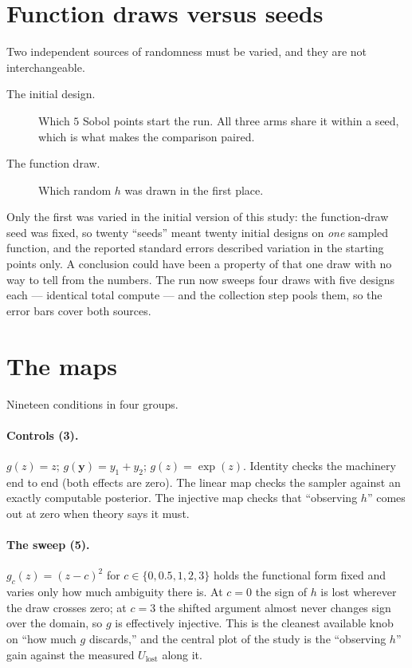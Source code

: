 \documentclass[11pt]{article}
\newcommand{\Ulost}{U_{\text{lost}}}
\begin{document}
\section{Function draws versus seeds}
\label{sec:seeds}

Two independent sources of randomness must be varied, and they are not
interchangeable.

\begin{description}
\item[The initial design.] Which $5$ Sobol points start the run. All three arms
share it within a seed, which is what makes the comparison paired.
\item[The function draw.] Which random $h$ was drawn in the first place.
\end{description}

Only the first was varied in the initial version of this study: the
function-draw seed was fixed, so twenty ``seeds'' meant twenty initial designs
on \emph{one} sampled function, and the reported standard errors described
variation in the starting points only. A conclusion could have been a property
of that one draw with no way to tell from the numbers. The run now sweeps four
draws with five designs each --- identical total compute --- and the collection
step pools them, so the error bars cover both sources.

\section{The maps}

Nineteen conditions in four groups.

\paragraph{Controls (3).} $g(z)=z$; $g(\mathbf{y})=y_1+y_2$; $g(z)=\exp(z)$.
Identity checks the machinery end to end (both effects are zero). The linear map
checks the sampler against an exactly computable posterior. The injective map
checks that ``observing $h$'' comes out at zero when theory says it must.

\paragraph{The sweep (5).} $g_c(z)=(z-c)^2$ for $c\in\{0,0.5,1,2,3\}$ holds the
functional form fixed and varies only how much ambiguity there is. At $c=0$ the
sign of $h$ is lost wherever the draw crosses zero; at $c=3$ the shifted argument
almost never changes sign over the domain, so $g$ is effectively injective. This
is the cleanest available knob on ``how much $g$ discards,'' and the central plot
of the study is the ``observing $h$'' gain against the measured $\Ulost$ along
it.
\end{document}
